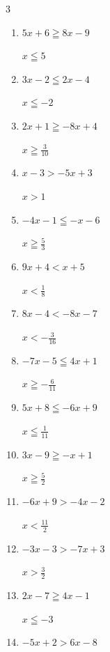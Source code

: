 \begin{multicols}{3}
\begin{enumerate}
  \item $5x+6\geqq 8x-9$

        $\displaystyle x\leqq 5$

  \item $3x-2\leqq 2x-4$

        $\displaystyle x\leqq -2$

  \item $2x+1\geqq -8x+4$

        $\displaystyle x\geqq \frac{3}{10}$

\columnbreak %

\resetques

  \item $x-3>-5x+3$

        $\displaystyle x>1$

  \item $-4x-1\leqq -x-6$

        $\displaystyle x\geqq \frac{5}{3}$

  \item $9x+4<x+5$

        $\displaystyle x<\frac{1}{8}$

  \item $8x-4<-8x-7$

        $\displaystyle x<-\frac{3}{16}$

  \item $-7x-5\leqq 4x+1$

        $\displaystyle x\geqq -\frac{6}{11}$

  \item $5x+8\leqq -6x+9$

        $\displaystyle x\leqq \frac{1}{11}$

  \item $3x-9\geqq -x+1$

        $\displaystyle x\geqq \frac{5}{2}$

  \item $-6x+9>-4x-2$

        $\displaystyle x<\frac{11}{2}$

  \item $-3x-3>-7x+3$

        $\displaystyle x>\frac{3}{2}$

  \item $2x-7\geqq 4x-1$

        $\displaystyle x\leqq -3$

  \item $-5x+2>6x-8$


\end{enumerate}
\end{multicols}
